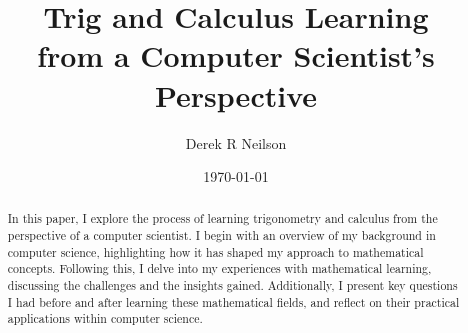 \documentclass{article}
\title{Trig and Calculus Learning \\from a Computer Scientist's Perspective}
\author{Derek R Neilson}
\date{\today}
\begin{document}
\maketitle

\begin{abstract}
    In this paper, I explore the process of learning trigonometry and calculus from the perspective of a computer scientist. I begin with an overview of my background in computer science, highlighting how it has shaped my approach to mathematical concepts. Following this, I delve into my experiences with mathematical learning, discussing the challenges and the insights gained. Additionally, I present key questions I had before and after learning these mathematical fields, and reflect on their practical applications within computer science.
\end{abstract}



\end{document}
